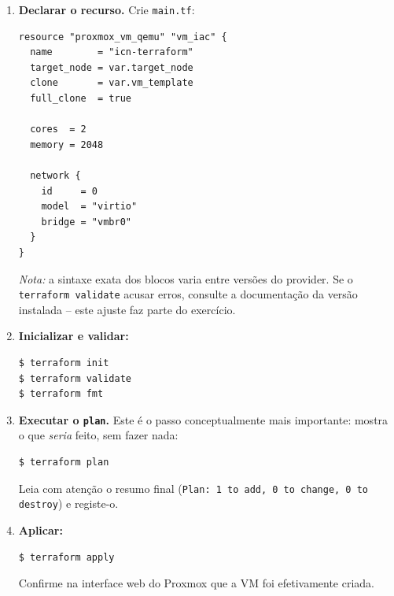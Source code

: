 \documentclass[11pt,a4paper]{article}
\begin{document}
\begin{enumerate}[label=\arabic*.,resume]
\begin{lstlisting}
variable "target_node" {
  type = string
}

variable "vm_template" {
  type = string
}
\end{lstlisting}
  Os valores concretos vão num ficheiro \texttt{terraform.tfvars} \textbf{que nunca deve ser commitado} num repositório:
\begin{lstlisting}
pm_api_url          = "https://<IP-do-servidor>:8006/api2/json"
pm_api_token_id     = "<utilizador>@pve!<nome-do-token>"
pm_api_token_secret = "<segredo-do-token>"
target_node         = "<nome-do-node>"
vm_template         = "<nome-do-template>"
\end{lstlisting}
  Crie também um \texttt{.gitignore} com \texttt{terraform.tfvars} e \texttt{*.tfstate*}, pelas razões discutidas na teoria.

  \item \textbf{Declarar o recurso.} Crie \texttt{main.tf}:
\begin{lstlisting}
resource "proxmox_vm_qemu" "vm_iac" {
  name        = "icn-terraform"
  target_node = var.target_node
  clone       = var.vm_template
  full_clone  = true

  cores  = 2
  memory = 2048

  network {
    id     = 0
    model  = "virtio"
    bridge = "vmbr0"
  }
}
\end{lstlisting}
  \emph{Nota:} a sintaxe exata dos blocos varia entre versões do provider. Se o \texttt{terraform validate} acusar erros, consulte a documentação da versão instalada -- este ajuste faz parte do exercício.

  \item \textbf{Inicializar e validar:}
\begin{lstlisting}
$ terraform init
$ terraform validate
$ terraform fmt
\end{lstlisting}

  \item \textbf{Executar o \texttt{plan}.} Este é o passo conceptualmente mais importante: mostra o que \emph{seria} feito, sem fazer nada:
\begin{lstlisting}
$ terraform plan
\end{lstlisting}
  Leia com atenção o resumo final (\texttt{Plan: 1 to add, 0 to change, 0 to destroy}) e registe-o.

  \item \textbf{Aplicar:}
\begin{lstlisting}
$ terraform apply
\end{lstlisting}
  Confirme na interface web do Proxmox que a VM foi efetivamente criada.


\end{enumerate}
\end{document}
